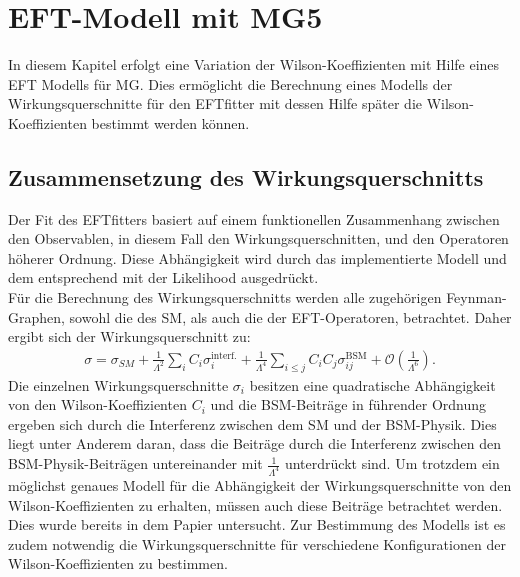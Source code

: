 \chapter{EFT-Modell mit MG5}
In diesem Kapitel erfolgt eine Variation der Wilson-Koeffizienten mit Hilfe eines EFT Modells für MG. Dies ermöglicht die Berechnung eines Modells der Wirkungsquerschnitte für den EFTfitter mit dessen Hilfe später die Wilson-Koeffizienten bestimmt werden können.

\section{Zusammensetzung des Wirkungsquerschnitts}
Der Fit des EFTfitters basiert auf einem funktionellen Zusammenhang zwischen den Observablen, in diesem Fall den Wirkungsquerschnitten, und den Operatoren höherer Ordnung. Diese Abhängigkeit wird durch das implementierte Modell und dem entsprechend mit der Likelihood ausgedrückt.\\
Für die Berechnung des Wirkungsquerschnitts werden alle zugehörigen Feynman-Graphen, sowohl die des SM, als auch die der EFT-Operatoren, betrachtet. Daher ergibt sich der Wirkungsquerschnitt zu:
\begin{align}
  \sigma = \sigma_{SM} + \frac{1}{\Lambda^2} \sum_{i} C_i \sigma_i^\text{interf.} + \frac{1}{\Lambda^4} \sum_{i \leq j} C_i C_j \sigma_{ij}^\text{BSM} + \mathcal{O} \left(\frac{1}{\Lambda^6}\right).
\end{align}
Die einzelnen Wirkungsquerschnitte $\sigma_i$ besitzen eine quadratische Abhängigkeit von den Wilson-Koeffizienten $C_i$ und die BSM-Beiträge in führender Ordnung ergeben sich durch die Interferenz zwischen dem SM und der BSM-Physik. Dies liegt unter Anderem daran, dass die Beiträge durch die Interferenz zwischen den BSM-Physik-Beiträgen untereinander mit $\frac{1}{\Lambda^4}$ unterdrückt sind. Um trotzdem ein möglichst genaues Modell für die Abhängigkeit der Wirkungsquerschnitte von den Wilson-Koeffizienten zu erhalten, müssen auch diese Beiträge betrachtet werden. Dies wurde bereits in dem Papier\cite{Wilson-Beiträge} untersucht. Zur Bestimmung des Modells ist es zudem notwendig die Wirkungsquerschnitte für verschiedene Konfigurationen der Wilson-Koeffizienten zu bestimmen.

